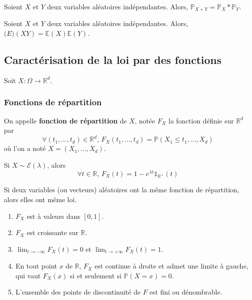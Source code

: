 	\begin{corollary}
		Soient $X$ et $Y$ deux variables aléatoires indépendantes. Alors, $\mathbb{P}_{X+Y} = \mathbb{P}_X * \mathbb{P}_Y$.
	\end{corollary}
	
	\begin{proposition}
		Soient $X$ et $Y$ deux variables aléatoires indépendantes. Alors, $\mathbb(E)(XY) = \mathbb{E}(X) \mathbb{E}(Y)$.
	\end{proposition}
	
	\newpage
	
	\subsection{Caractérisation de la loi par des fonctions}
	
	Soit $X : \Omega \rightarrow \mathbb{R}^d$.
	
	\subsubsection{Fonctions de répartition}
	
	
	\begin{definition}
		On appelle \textbf{fonction de répartition} de $X$, notée $F_X$ la fonction définie sur $\mathbb{R}^d$ par
		\[ \forall (t_1, \dots, t_d) \in \mathbb{R}^d, \, F_X(t_1, \dots, t_d) = \mathbb{P}(X_1 \leq t_1, \dots, X_d) \]
		où l'on a noté $X = (X_1, \dots, X_d)$.
	\end{definition}
	
	
	\begin{example}
		Si $X \sim \mathcal{E}(\lambda)$, alors
		\[ \forall t \in \mathbb{R}, \, F_X(t) = 1 - e^{\lambda t} \mathbb{1}_{\mathbb{R}^+}(t) \]
	\end{example}
	
	
	\begin{theorem}
		Si deux variables (ou vecteurs) aléatoires ont la même fonction de répartition, alors elles ont même loi.
	\end{theorem}
	
	\begin{theorem}
		\begin{enumerate}[label=(\roman*)]
			\item $F_X$ est à valeurs dans $[0,1]$.
			\item $F_X$ est croissante sur $\mathbb{R}$.
			\item $\lim_{t \rightarrow -\infty} F_X(t) = 0$ et $\lim_{t \rightarrow +\infty} F_X(t) = 1$.
			\item En tout point $x$ de $\mathbb{R}$, $F_X$ est continue à droite et admet une limite à gauche, qui vaut $F_X(x)$ si et seulement si $\mathbb{P}(X=x) = 0$.
			\item L'ensemble des points de discontinuité de $F$ est fini ou dénombrable.
		\end{enumerate}
	\end{theorem}
	

